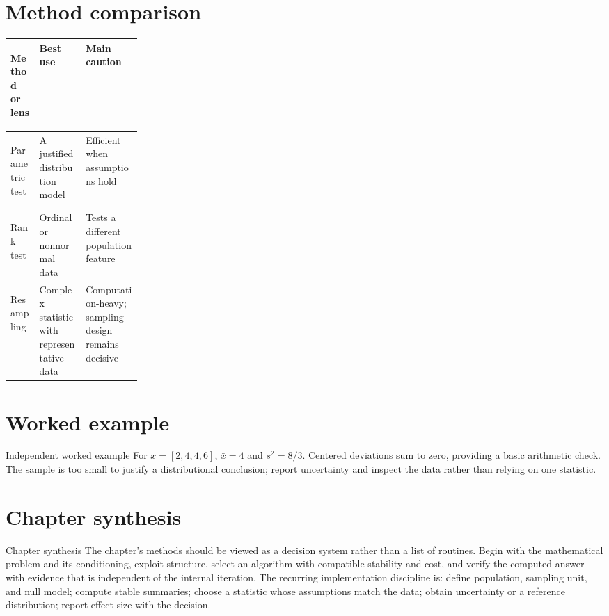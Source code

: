 \documentclass[10pt,letterpaper]{article}
\begin{document}
\section*{Method comparison}
\begin{center}
\small
\begin{tabularx}{\linewidth}{>{\bfseries\raggedright\arraybackslash}p{0.22\linewidth}XX}
\toprule
Method or lens & Best use & Main caution \\
\midrule
Parametric test & A justified distribution model & Efficient when assumptions hold \\
Rank test & Ordinal or nonnormal data & Tests a different population feature \\
Resampling & Complex statistic with representative data & Computation-heavy; sampling design remains decisive \\
\bottomrule
\end{tabularx}
\end{center}

\section*{Worked example}
\begin{exambox}{Independent worked example}
For $x=[2,4,4,6]$, $\bar{x}=4$ and $s^2=8/3$.  Centered deviations sum to zero, providing a basic arithmetic check.  The sample is too small to justify a distributional conclusion; report uncertainty and inspect the data rather than relying on one statistic.
\end{exambox}

\section*{Chapter synthesis}
\begin{summarybox}{Chapter synthesis}
The chapter's methods should be viewed as a decision system rather than a list of routines.  Begin with the mathematical problem and its conditioning, exploit structure, select an algorithm with compatible stability and cost, and verify the computed answer with evidence that is independent of the internal iteration.  The recurring implementation discipline is: define population, sampling unit, and null model; compute stable summaries; choose a statistic whose assumptions match the data; obtain uncertainty or a reference distribution; report effect size with the decision.
\end{summarybox}
\end{document}
